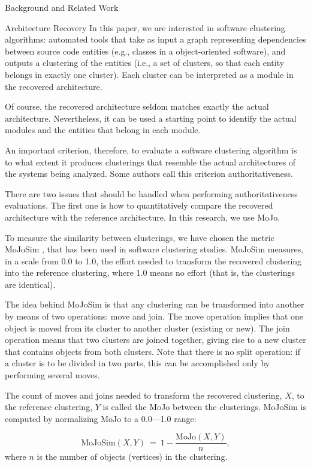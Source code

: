 \documentclass[11pt,twocolumn,a4paper,english]{article}
\begin{document}
\begin{section}{Background and Related Work}
\begin{subsection}{Architecture Recovery}
	In this paper, we are interested in software clustering algorithms: automated tools that take as input a graph representing dependencies between source code entities (e.g., classes in a object-oriented software), and outputs a clustering of the entities (i.e., a set of clusters, so that each entity belongs in exactly one cluster). Each cluster can be interpreted as a module in the recovered architecture.
	
	Of course, the recovered architecture seldom matches exactly the actual architecture. Nevertheless, it can be used a starting point to identify the actual modules and the entities that belong in each module. 
	
	An important criterion, therefore, to evaluate a software clustering algorithm is to what extent it produces clusterings that resemble the actual architectures of the systems being analyzed. Some authors call this criterion authoritativeness.
	
	There are two issues that should be handled when performing authoritativeness evaluations. The first one is how to quantitatively compare the recovered architecture with the reference architecture. In this research, we use MoJo.
	
	To measure the similarity between clusterings, we have chosen the metric MoJoSim \cite{Bittencourt2009}, that has been used in software clustering studies. MoJoSim measures, in a scale from 0.0 to 1.0, the effort needed to transform the recovered clustering into the reference clustering, where 1.0 means no effort (that is, the clusterings are identical).
	
	The idea behind MoJoSim is that any clustering can be transformed into another by means of two operations: move and join. The move operation implies that one object is moved from its cluster to another cluster (existing or new). The join operation means that two clusters are joined together, giving rise to a new cluster that contains objects from both clusters. Note that there is no split operation: if a cluster is to be divided in two parts, this can be accomplished only by performing several moves.
	
	The count of moves and joins needed to transform the recovered clustering, $X$, to the reference clustering, $Y$ is called the MoJo between the clusterings. MoJoSim is computed by normalizing MoJo to a 0.0---1.0 range:
	
	$$
	\mathrm{MoJoSim}(X, Y) ~=~ 1 - \frac{\mathrm{MoJo}(X, Y)}{n}\mathrm{,}
	$$
where $n$ is the number of objects (vertices) in the clustering.
	

\end{subsection}
\end{section}
\end{document}
